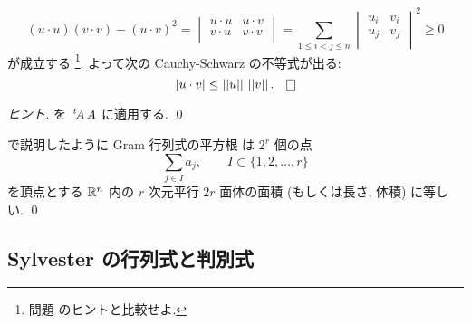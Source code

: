 \documentclass[12pt,twoside]{jarticle}
\begin{document}
\begin{question}
\begin{equation*}
    (u\cdot u)(v\cdot v) - (u\cdot v)^2
    =
    \begin{vmatrix}
      u\cdot u & u\cdot v \\
      v\cdot u & v\cdot v \\
    \end{vmatrix}
    =
    \sum_{1\le i<j\le n}
    \begin{vmatrix}
      u_i & v_i \\
      u_j & v_j \\
    \end{vmatrix}^2
    \ge 0
  \end{equation*}
  が成立する%
  \footnote{問題  のヒントと比較せよ.}.
  よって次の Cauchy-Schwarz の不等式が出る:
  \begin{equation*}
    |u\cdot v| \le \norm{u}\, \norm{v}.
    \qed
  \end{equation*}
\end{question}

\begin{proof}[ヒント]
  を $\tp{\!A}\,A$ に適用する. \qed
\end{proof}

\begin{guide}
  \label{guide:sqrt-Gramian}
  で説明したように Gram 行列式の平方根
  は $2^r$ 個の点
  \begin{equation*}
    \sum_{j\in I} a_j, \qquad I\subset\{1,2,\ldots,r\}
  \end{equation*}
  を頂点とする ${\mathbb R}^n$ 内の $r$ 次元平行 $2r$ 面体の面積
  (もしくは長さ, 体積) に等しい. 
  \qed
\end{guide}


\subsection{Sylvester の行列式と判別式}
\end{document}
